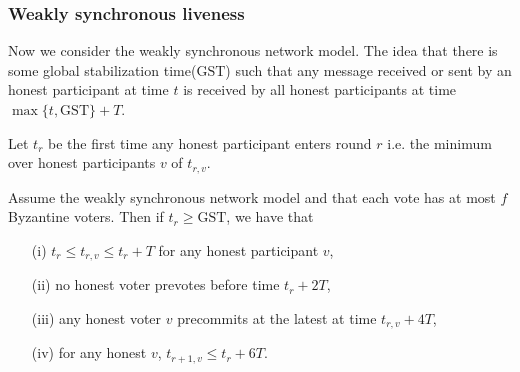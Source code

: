 \documentclass[a4paper,UKenglish,cleveref, autoref, thm-restate, anonymous]{lipics-v2019}
\def\GST{\mathrm{GST}}
\begin{document}
\subsubsection{Weakly synchronous liveness}

Now we consider the weakly synchronous network model. The idea that there is some global stabilization time($\GST$) such that any message received or sent by an honest participant at time $t$ is received by all honest participants at time $\max\{t,\GST\}+T$.

Let $t_r$ be the first time any honest participant enters round $r$ i.e. the minimum over honest participants $v$ of $t_{r,v}$.

\begin{lemma} \label{lem:timings}
Assume the weakly synchronous network model and that each vote has at most $f$ Byzantine voters. Then if $t_r \geq \GST$, we have that
\begin{itemize}
\item[(i)] $t_r \leq t_{r,v} \leq t_r+T$ for any honest participant $v$,
\item[(ii)] no honest voter prevotes before time $t_r+2T$,
\item[(iii)] any honest voter $v$ precommits at the latest at time $t_{r,v}+4T$,
\item[(iv)] for any honest $v$, $t_{r+1,v} \leq t_r + 6T$.
\end{itemize}
\end{lemma}
\end{document}
